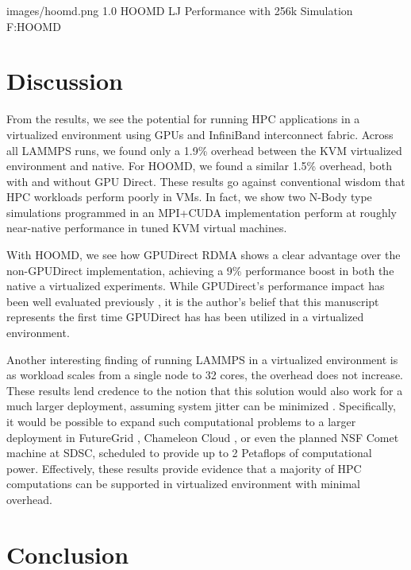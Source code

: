 \documentclass[10pt]{sigplanconf}
\begin{document}
  {images/hoomd.png}
  {1.0}
  {HOOMD LJ Performance with 256k Simulation}
  {F:HOOMD}


\section{Discussion}\label{discussion}

From the results, we see the potential for running HPC applications in a virtualized environment using GPUs and InfiniBand interconnect fabric. Across all LAMMPS runs, we found only a 1.9\% overhead between the KVM virtualized environment and native. For HOOMD, we found a similar 1.5\% overhead, both with and without GPU Direct. These results go against conventional wisdom that HPC workloads perform poorly in VMs. In fact, we show two N-Body type simulations programmed in an MPI+CUDA implementation perform at roughly near-native performance in tuned KVM virtual machines.  

With HOOMD, we see how GPUDirect RDMA shows a clear advantage over the
non-GPUDirect implementation, achieving a 9\% performance boost in both the
native a virtualized experiments.  While GPUDirect's performance impact has been well evaluated previously \cite{GPUDirect}, it is the author's belief that this manuscript represents the first time GPUDirect has has been utilized in a virtualized environment.  

Another interesting finding of running LAMMPS in a virtualized environment is as workload scales from a single node to 32 cores, the overhead does not increase. These results lend credence to the notion that this solution would also work for a much larger deployment, assuming system jitter can be minimized \cite{Seelam2010}. Specifically, it would be possible to expand such computational problems to a larger deployment in FutureGrid \cite{fox2013futuregrid}, Chameleon Cloud \cite{www-chameleon}, or even the planned NSF Comet machine at SDSC, scheduled to provide up to 2 Petaflops of computational power. Effectively, these results provide evidence that a majority of HPC computations can be supported in virtualized environment with minimal overhead. 


\section{Conclusion}\label{conclusion}
\end{document}
